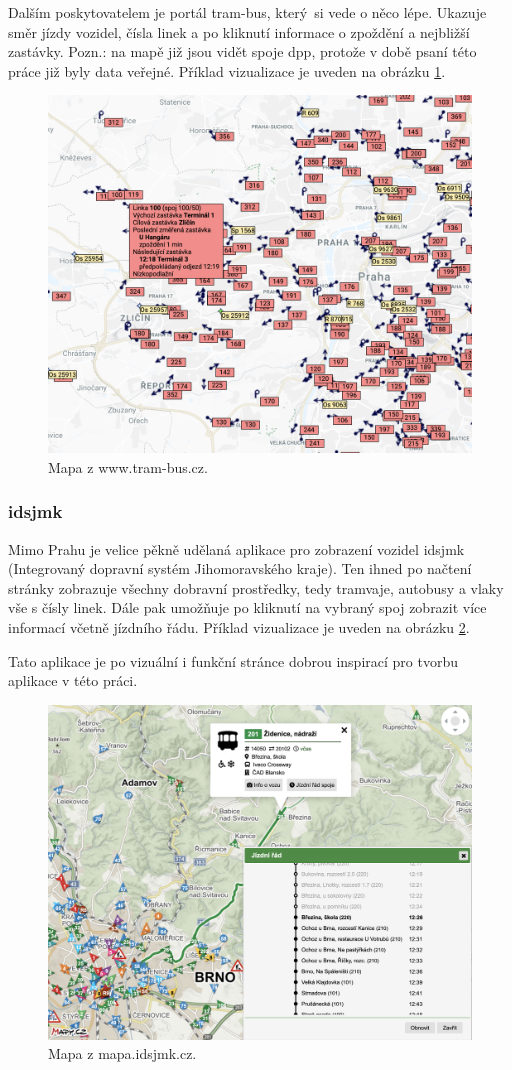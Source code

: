 Dalším poskytovatelem je portál tram-bus, který si vede o něco lépe. Ukazuje směr jízdy vozidel, čísla linek a po kliknutí informace o zpoždění a nejbližší zastávky. Pozn.: na mapě již jsou vidět spoje \gls{dpp}, protože v době psaní této práce již byly data veřejné. Příklad vizualizace je uveden na obrázku \ref{fig:tram-bus_result}.

\begin{figure}
	\centering
  \includegraphics[width=0.5\linewidth]{../img/tram-bus_mapa.png}
  \caption{Mapa z www.tram-bus.cz.}
  \label{fig:tram-bus_result}
\end{figure}

\subsubsection{\gls{idsjmk}}

Mimo Prahu je velice pěkně udělaná aplikace pro zobrazení vozidel \gls{idsjmk} (Integrovaný dopravní systém Jihomoravského kraje). Ten ihned po načtení stránky zobrazuje všechny dobravní prostředky, tedy tramvaje, autobusy a vlaky vše s čísly linek. Dále pak umožňuje po kliknutí na vybraný spoj zobrazit více informací včetně jízdního řádu. Příklad vizualizace je uveden na obrázku \ref{fig:idsjmk_result}.

\bigbreak

Tato aplikace je po vizuální i funkční stránce dobrou inspirací pro tvorbu aplikace v této práci.

\begin{figure}
	\centering
  \includegraphics[width=0.5\linewidth]{../img/idsjmk_mapa.png}
  \caption{Mapa z mapa.idsjmk.cz.}
  \label{fig:idsjmk_result}
\end{figure}
